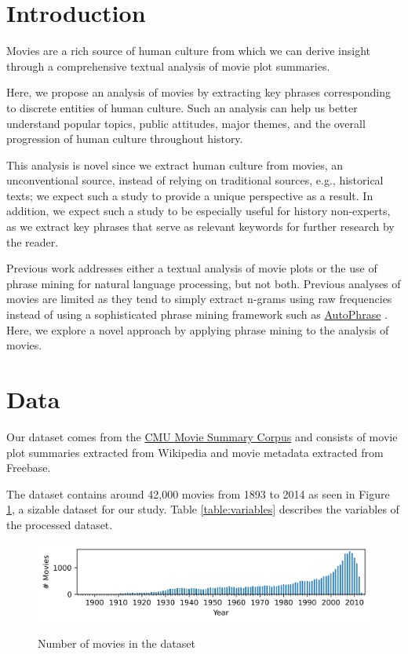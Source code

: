 \documentclass{article}
\begin{document}
\begin{multicols}{2}
\section{Introduction} %
Movies are a rich source of human culture from which we can derive insight through a comprehensive textual analysis of movie plot summaries.

Here, we propose an analysis of movies by extracting key phrases corresponding to discrete entities of human culture. Such an analysis can help us better understand popular topics, public attitudes, major themes, and the overall progression of human culture throughout history.

This analysis is novel since we extract human culture from movies, an unconventional source, instead of relying on traditional sources, e.g., historical texts; we expect such a study to provide a unique perspective as a result. In addition, we expect such a study to be especially useful for history non-experts, as we extract key phrases that serve as relevant keywords for further research by the reader.

Previous work addresses either a textual analysis of movie plots or the use of phrase mining for natural language processing, but not both. Previous analyses of movies are limited as they tend to simply extract n-grams using raw frequencies instead of using a sophisticated phrase mining framework such as \href{https://github.com/shangjingbo1226/AutoPhrase}{AutoPhrase} \cite{DBLP:journals/corr/ShangLJRVH17}. Here, we explore a novel approach by applying phrase mining to the analysis of movies.

\section{Data}
Our dataset comes from the \href{http://www.cs.cmu.edu/~ark/personas/}{CMU Movie Summary Corpus} \cite{Bamman2013LearningLP} and consists of movie plot summaries extracted from Wikipedia and movie metadata extracted from Freebase.

The dataset contains around 42,000 movies from 1893 to 2014 as seen in Figure \ref{figure:number_movies_per_year_bar_chart}, a sizable dataset for our study. Table \ref{table:variables} describes the variables of the processed dataset.

\begin{figure}
\caption{Number of movies in the dataset}
\centering
\includegraphics[width=5in]{figures/number_movies_per_year_bar_chart.png}
\label{figure:number_movies_per_year_bar_chart}
\end{figure}


\end{multicols}
\end{document}
